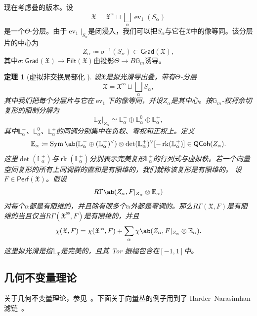 \documentclass{amsart}
\newtheorem{thm}{定理}[section]
\theoremstyle{definition}
\theoremstyle{remark}
\theoremstyle{plain}
\theoremstyle{definition}
\theoremstyle{remark}
\newcommand{\G}{\mathbb{G}}
\newcommand{\E}{\mathbb{E}}
\renewcommand{\L}{\mathbb{L}}
\newcommand{\mf}[1]{\mathfrak{#1}}
\newcommand{\mr}[1]{\mathrm{#1}}
\newcommand{\on}[1]{\operatorname{#1}}
\newcommand{\ms}[1]{\mathsf{#1}}
\newcommand{\1}{\mathbf{1}}
\newcommand{\2}{\mathbf{2}}
\newcommand{\3}{\mathbf{3}}
\DeclareMathOperator{\ev}{ev}
\begin{document}
现在考虑叠的版本。设
\[
    \mf{X}
    =
    \mf{X}^{\mr{ss}}
    \sqcup
    \bigsqcup_\alpha\ev_1(S_\alpha)
\]
是一个\(\Theta\)-分层。由于\(\ev_1|_{S_\alpha}\)是闭浸入，我们可以把\(S_\alpha\)与它在\(\mf{X}\)中的像等同。该分层片的中心为
\[
    Z_\alpha\coloneqq\sigma^{-1}(S_\alpha)\subset\ms{Grad}(\mf{X}),
\]
其中\(\sigma\colon\ms{Grad}(\mf{X})\to\ms{Filt}(\mf{X})\)由投影\(\Theta\to B\G_m\)诱导。

\begin{thm}[虚拟非交换局部化 {\cite[定理~5.1]{HLlocalization}}]
    设\(\mf{X}\)是拟光滑导出叠，带有\(\Theta\)-分层
    \[
        \mf{X}
        =
        \mf{X}^{\mr{ss}}
        \sqcup
        \bigsqcup_\alpha S_\alpha,
    \]
    其中我们把每个分层片与它在\(\ev_1\)下的像等同，并设\(Z_\alpha\)是其中心。按\(\G_m\)-权将余切复形的限制分解为
    \[
        \L_{\mf{X}}|_{Z_\alpha}
        \simeq
        \L_\alpha^-
        \oplus
        \L_\alpha^0
        \oplus
        \L_\alpha^+,
    \]
    其中\(\L_\alpha^-\)、\(\L_\alpha^0\)、\(\L_\alpha^+\)的同调分别集中在负权、零权和正权上。定义
    \[
        \E_\alpha
        \coloneqq
        \on{Sym}\ab(
            \L_\alpha^-
            \oplus
            (\L_\alpha^+)^\vee
        )
        \otimes
        \det(\L_\alpha^+)^\vee
        [-\on{rk}(\L_\alpha^+)]
        \in
        \ms{QCoh}(Z_\alpha).
    \]
    这里\(\det(\L_\alpha^+)\)与\(\on{rk}(\L_\alpha^+)\)分别表示完美复形\(\L_\alpha^+\)的行列式与虚拟秩。若一个向量空间复形的所有上同调群的直和是有限维的，我们就称该复形是有限维的。
    设\(F\in\ms{Perf}(\mf{X})\)。假设
    \[
        R\Gamma\ab(
            Z_\alpha,
            F|_{Z_\alpha}\otimes\E_\alpha
        )
    \]
    对每个\(\alpha\)都是有限维的，并且除有限多个\(\alpha\)外都是零调的。那么\(R\Gamma(\mf{X},F)\)是有限维的当且仅当\(R\Gamma(\mf{X}^{\mr{ss}},F)\)是有限维的，并且
    \[
        \chi(\mf{X},F)
        =
        \chi(\mf{X}^{\mr{ss}},F)
        +
        \sum_\alpha
        \chi\ab(
            Z_\alpha,
            F|_{Z_\alpha}\otimes\E_\alpha
        ).
    \]
    这里拟光滑是指\(\L_{\mf{X}}\)是完美的，且其 Tor 振幅包含在\([-1,1]\)中。
\end{thm}


\subsection{几何不变量理论}%
\label{sub:Geometric invariant theory}

关于几何不变量理论，参见~\cite{MFK1994}。下面关于向量丛的例子用到了 Harder--Narasimhan 滤链~\cite{HN1975}。
\end{document}
